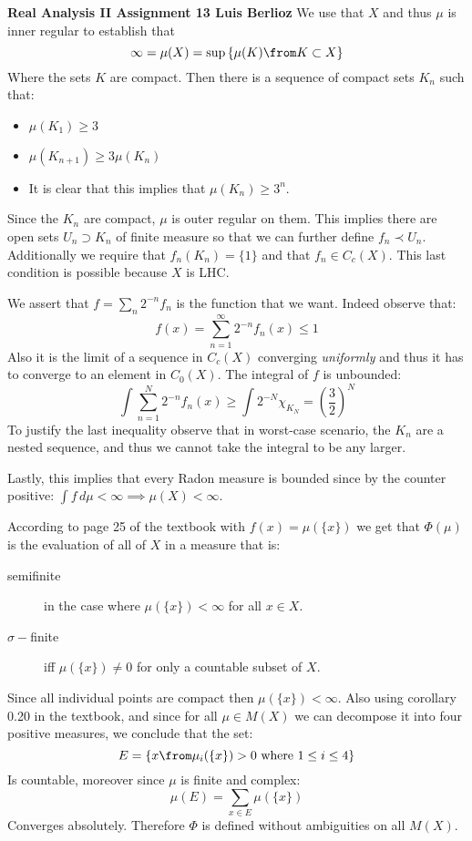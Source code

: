\noindent\textbf{Real Analysis II Assignment 13 \hspace{\fill} Luis Berlioz}
We use that $X$ and thus $\mu$ is inner regular to establish that   
$$\infty = \mu(X) = \sup\left\{ \mu (K) \from K\subset X \right \}$$
Where the sets $K$ are compact. Then there is a sequence of compact sets $K_n$ such that:
\begin{itemize}
\item $\mu(K_1) \geq 3$
\item $\mu( K_{n+1} ) \geq 3\mu (K_n)$
\item It is clear that this implies that $\mu(K_n)\geq 3^n$.
\end{itemize}
Since the $K_n$ are compact, $\mu$ is outer regular on them. This implies there are open sets $U_n\supset K_n$ of finite measure so that we can further define $f_n\prec U_n$. Additionally we require that $f_n(K_n) =\{1\}$ and that $f_n \in C_c(X)$. This last condition is possible because $X$ is LHC. 

We assert that $f=\sum_n 2^{-n} f_n$ is the function that we want. Indeed observe that:
$$f(x) = \sum_{n=1}^\infty 2^{-n} f_n(x) \leq 1$$
Also it is the limit of a sequence in $C_c(X)$ converging \emph{uniformly} and thus it has to converge to an element in $C_0(X)$.
The integral of $f$ is unbounded:
$$\int \sum_{n=1}^N 2^{-n} f_n(x)\geq   \int 2^{-N}\chi_{K_N}=\left( \frac 32\right)^N$$
To justify the last inequality observe that in worst-case scenario, the $K_n$ are a nested sequence, and thus we cannot take the integral to be any larger.

Lastly, this implies that every Radon measure is bounded since by the counter positive: $\int f \, d\mu <\infty \implies \mu(X)<\infty$.

According to page 25 of the textbook with $f(x) = \mu(\{x\})$ we get that $\Phi(\mu)$ is the evaluation of all of $X$ in a measure that is: 
\begin{description}
    \item[semifinite] in the case where $\mu(\{x\})<\infty$ for all $x\in X$.
    \item[$\sigma-$finite] iff $\mu(\{x\})\neq0$ for only a countable subset of $X$.
\end{description}
Since all individual points are compact then $\mu(\{x\})<\infty$. Also using corollary 0.20 in the textbook, and since for all $\mu \in M(X)$ we can decompose it into four positive measures, we conclude that the set:
$$E= \left\{ x \from \mu_i(\{x\})>0 \text{ where } 1\leq i \leq 4\right \}$$
Is countable, moreover since $\mu$ is finite and complex:
$$\mu(E) = \sum_{x\in E} \mu(\{x\})$$
Converges absolutely. Therefore $\Phi$ is defined without ambiguities on all $M(X)$.

